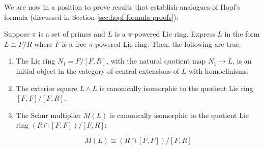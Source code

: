 \documentclass{ucetd}
\begin{document}
We are now in a position to prove results that establish analogues of
Hopf's formula (discussed in Section \ref{sec:hopf-formula-proofs}):

\begin{theorem}
  Suppose $\pi$ is a set of primes and $L$ is a $\pi$-powered
   Lie ring. Express $L$ in the form $L \cong F/R$ where $F$ is
  a free $\pi$-powered Lie ring. Then, the following are true.

  \begin{enumerate}
  \item The Lie ring $N_1 = F/[F,R]$, with the natural quotient map $N_1
    \to L$, is an initial object in the category of central extensions
    of $L$ with homoclinisms.
  \item The exterior square $L \wedge L$ is canonically isomorphic to
    the quotient Lie ring $[F,F]/[F,R]$.
  \item The Schur multiplier $M(L)$ is canonically isomorphic to the
    quotient Lie ring $(R \cap [F,F])/[F,R]$:

    \begin{equation}\label{eq:pi-powered-hopf-formula-lie}
      M(L) \cong (R \cap [F,F])/[F,R]
    \end{equation}
  \end{enumerate}
\end{theorem}
\end{document}
